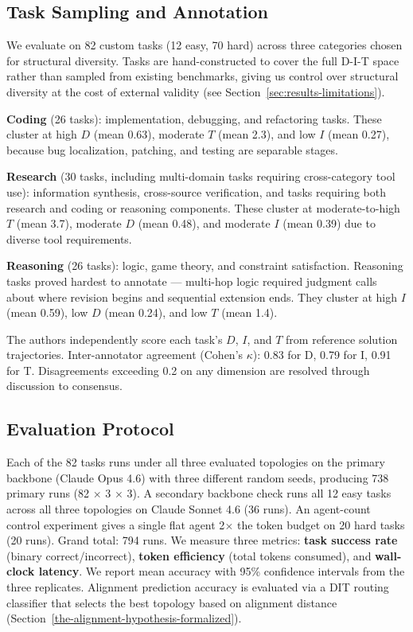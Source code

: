 \subsection{Task Sampling and Annotation}\label{task-sampling-and-annotation}

We evaluate on 82 custom tasks (12 easy, 70 hard) across three categories chosen for structural diversity. Tasks are hand-constructed to cover the full D-I-T space rather than sampled from existing benchmarks, giving us control over structural diversity at the cost of external validity (see Section~\ref{sec:results-limitations}).

\textbf{Coding} (26 tasks): implementation, debugging, and refactoring tasks. These cluster at high $D$ (mean 0.63), moderate $T$ (mean 2.3), and low $I$ (mean 0.27), because bug localization, patching, and testing are separable stages.

\textbf{Research} (30 tasks, including multi-domain tasks requiring cross-category tool use): information synthesis, cross-source verification, and tasks requiring both research and coding or reasoning components. These cluster at moderate-to-high $T$ (mean 3.7), moderate $D$ (mean 0.48), and moderate $I$ (mean 0.39) due to diverse tool requirements.

\textbf{Reasoning} (26 tasks): logic, game theory, and constraint satisfaction. Reasoning tasks proved hardest to annotate --- multi-hop logic required judgment calls about where revision begins and sequential extension ends. They cluster at high $I$ (mean 0.59), low $D$ (mean 0.24), and low $T$ (mean 1.4).

The authors independently score each task's $D$, $I$, and $T$ from reference solution trajectories. Inter-annotator agreement (Cohen's $\kappa$): 0.83 for D, 0.79 for I, 0.91 for T. Disagreements exceeding 0.2 on any dimension are resolved through discussion to consensus.

\subsection{Evaluation Protocol}\label{evaluation-protocol}

Each of the 82 tasks runs under all three evaluated topologies on the primary backbone (Claude Opus 4.6) with three different random seeds, producing 738 primary runs (82 $\times$ 3 $\times$ 3). A secondary backbone check runs all 12 easy tasks across all three topologies on Claude Sonnet 4.6 (36 runs). An agent-count control experiment gives a single flat agent 2$\times$ the token budget on 20 hard tasks (20 runs). Grand total: 794 runs. We measure three metrics: \textbf{task success rate} (binary correct/incorrect), \textbf{token efficiency} (total tokens consumed), and \textbf{wall-clock latency}. We report mean accuracy with 95\% confidence intervals from the three replicates. Alignment prediction accuracy is evaluated via a DIT routing classifier that selects the best topology based on alignment distance (Section~\ref{the-alignment-hypothesis-formalized}).
